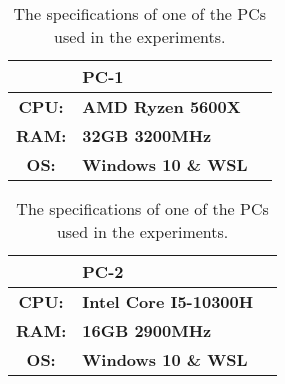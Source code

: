 
\begin{table}[htb!]
    \centering
    \begin{tabular}{cp{}p{}}
        \toprule
        \textbf{} & \textbf{PC-1} \\
        \midrule
        \textbf{CPU:} & \textbf{AMD Ryzen 5600X} \\
        \textbf{RAM:} & \textbf{32GB 3200MHz} \\
        \textbf{OS:} & \textbf{Windows 10 \& WSL} \\
        \bottomrule
    \end{tabular}
    \caption{The specifications of one of the PCs used in the experiments.}
    \label{tab:pc1-specs}
\end{table}

\begin{table}[htb!]
    \centering
    \begin{tabular}{cp{}p{}}
        \toprule
        \textbf{} & \textbf{PC-2} \\
        \midrule
        \textbf{CPU:} & \textbf{Intel Core I5-10300H} \\
        \textbf{RAM:} & \textbf{16GB 2900MHz} \\
        \textbf{OS:} & \textbf{Windows 10 \& WSL} \\
        \bottomrule
    \end{tabular}
    \caption{The specifications of one of the PCs used in the experiments.}
    \label{tab:pc2-specs}
\end{table}

